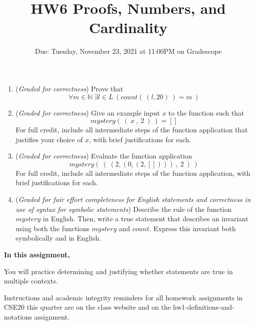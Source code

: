 \documentclass[12pt, oneside]{article}
\begin{document}
\begin{enumerate}
   \begin{enumerate}
        \item ({\it Graded for correctness}) Prove that
            \[
                \forall m \in \mathbb{N}~ \exists l \in L ~\left( count(~(l,20)~) = m~ \right)
            \]

        \item ({\it Graded for correctness}) Give an example input $x$ to the function such that 
            \[
               mystery( ~(~ x ~,~ 2~) ~) = []
            \]
           For full credit, include all intermediate steps of the function application
           that justifies your choice of $x$, with brief justifications for each.

        \item ({\it Graded for correctness}) Evaluate the function application
            \[
                mystery( ~(~ (2, (0, (2, []) ) ) ~,~ 2~) ~)
            \]
         For full credit, include all intermediate steps of the function application,
         with brief justifications for each.
   
        \item ({\it Graded for fair effort completeness for English statements and correctness in use 
        of syntax for symbolic statements}) Describe the rule of the function 
        $mystery$ in English. Then, write a true statement that describes an invariant using
        both the functions $mystery$ and $count$. Express this invariant both symbolically 
        and in English.
    \end{enumerate}

\end{enumerate}

    
\newpage

\title{HW6 Proofs, Numbers, and Cardinality}
\date{Due: Tuesday, November 23, 2021 at 11:00PM on Gradescope}


\maketitle
\thispagestyle{fancy}

{\bf In this assignment,}

You will practice determining and justifying whether 
statements are true in multiple contexts.

Instructions and academic integrity reminders for all homework assignments in 
CSE20 this quarter are on the class website and on the hw1-definitions-and-notations
assignment.
\end{document}
